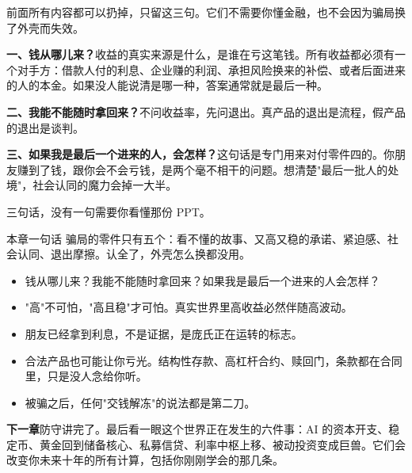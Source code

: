 前面所有内容都可以扔掉，只留这三句。它们不需要你懂金融，也不会因为骗局换了外壳而失效。

\textbf{一、钱从哪儿来？}收益的真实来源是什么，是谁在亏这笔钱。所有收益都必须有一个对手方：借款人付的利息、企业赚的利润、承担风险换来的补偿、或者后面进来的人的本金。如果没人能说清是哪一种，答案通常就是最后一种。

\textbf{二、我能不能随时拿回来？}不问收益率，先问退出。真产品的退出是流程，假产品的退出是谈判。

\textbf{三、如果我是最后一个进来的人，会怎样？}这句话是专门用来对付零件四的。你朋友赚到了钱，跟你会不会亏钱，是两个毫不相干的问题。想清楚"最后一批人的处境"，社会认同的魔力会掉一大半。

三句话，没有一句需要你看懂那份 PPT。

\begin{takeaway}{本章一句话}
骗局的零件只有五个：看不懂的故事、又高又稳的承诺、紧迫感、社会认同、退出摩擦。认全了，外壳怎么换都没用。

\begin{itemize}
  \item 钱从哪儿来？我能不能随时拿回来？如果我是最后一个进来的人会怎样？
  \item "高"不可怕，"高且稳"才可怕。真实世界里高收益必然伴随高波动。
  \item 朋友已经拿到利息，不是证据，是庞氏正在运转的标志。
  \item 合法产品也可能让你亏光。结构性存款、高杠杆合约、赎回门，条款都在合同里，只是没人念给你听。
  \item 被骗之后，任何"交钱解冻"的说法都是第二刀。
\end{itemize}

\end{takeaway}

\begin{bridgebox}
\textbf{下一章}防守讲完了。最后看一眼这个世界正在发生的六件事：AI 的资本开支、稳定币、黄金回到储备核心、私募信贷、利率中枢上移、被动投资变成巨兽。它们会改变你未来十年的所有计算，包括你刚刚学会的那几条。
\end{bridgebox}

